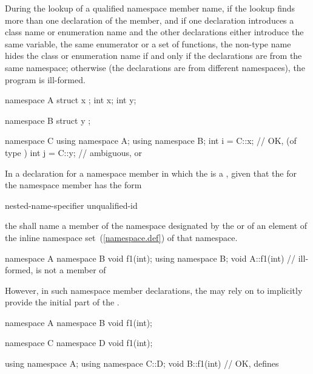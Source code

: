 \pnum
During the lookup of a qualified namespace member name, if the lookup
finds more than one declaration of the member, and if one declaration
introduces a class name or enumeration name and the other declarations
either introduce the same variable, the same enumerator or a set of
functions, the non-type name hides the class or enumeration name if and
only if the declarations are from the same namespace; otherwise (the
declarations are from different namespaces), the program is ill-formed.
\begin{example}

\begin{codeblock}
namespace A {
  struct x { };
  int x;
  int y;
}

namespace B {
  struct y { };
}

namespace C {
  using namespace A;
  using namespace B;
  int i = C::x;     // OK,  (of type )
  int j = C::y;     // ambiguous,  or 
}
\end{codeblock}
\end{example}

\pnum
In a declaration for a namespace member in which the
 is a , given that the
 for the namespace member has the form

\begin{ncbnf}
nested-name-specifier unqualified-id
\end{ncbnf}

the
 shall name a member of the namespace
designated by the 
or of an element of the inline namespace set~(\ref{namespace.def}) of that namespace.
\begin{example}

\begin{codeblock}
namespace A {
  namespace B {
    void f1(int);
  }
  using namespace B;
}
void A::f1(int){ }  // ill-formed,  is not a member of 
\end{codeblock}

\end{example} However, in such namespace member declarations, the
 may rely on 
to implicitly provide the initial part of the
. \begin{example}

\begin{codeblock}
namespace A {
  namespace B {
    void f1(int);
  }
}

namespace C {
  namespace D {
    void f1(int);
  }
}

using namespace A;
using namespace C::D;
void B::f1(int){ }  // OK, defines 
\end{codeblock}
\end{example}
%

